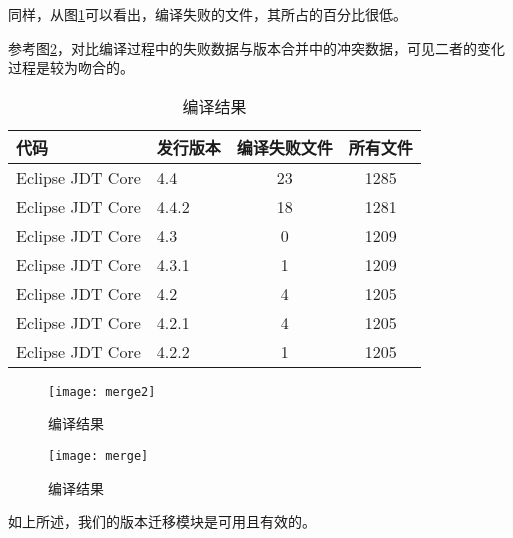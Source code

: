 同样，从图\ref {data_compile}可以看出，编译失败的文件，其所占的百分比很低。


参考图\ref {data_merge_compile}，对比编译过程中的失败数据与版本合并中的冲突数据，可见二者的变化过程是较为吻合的。

\begin{table}
	\caption{编译结果}
	\label{data_git_merge2}
	\centering
	\begin{tabular}{llcc}
		\toprule[1.5pt]
		{\heiti 代码} & {\heiti 发行版本} & {\heiti 编译失败文件} & {\heiti 所有文件}\\\midrule[1pt]
		Eclipse JDT Core & 4.4 & 23 & 1285\\
		Eclipse JDT Core & 4.4.2 & 18 & 1281\\
		Eclipse JDT Core & 4.3 & 0 & 1209\\
		Eclipse JDT Core & 4.3.1 & 1 & 1209\\
		Eclipse JDT Core & 4.2 & 4 & 1205\\
		Eclipse JDT Core & 4.2.1 & 4 & 1205\\
		Eclipse JDT Core & 4.2.2 & 1 & 1205\\
		\bottomrule[1.5pt]
	\end{tabular}
\end{table}

\begin{figure}[H]
	\centering
	\texttt{[image: merge2]}
	\caption {编译结果}
	\label {data_compile}	
\end{figure}

\begin{figure}[H]
	\centering
	\texttt{[image: merge]}
	\caption {编译结果}
	\label {data_merge_compile}	
\end{figure}



如上所述，我们的版本迁移模块是可用且有效的。

%
%

